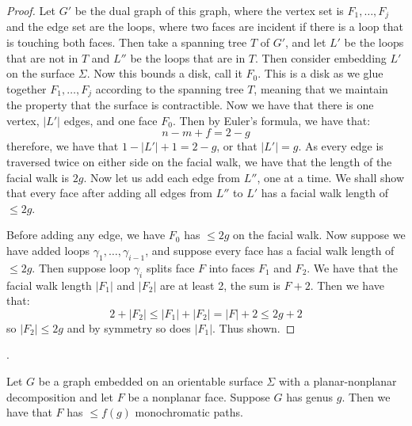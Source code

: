 \begin{proof}
	Let \(G'\) be the dual graph of this graph, where the vertex set is \(F_1, \ldots, F_j\) and the edge set are the loops, where two faces are incident if there is a loop that is touching both faces. Then take a spanning tree \(T\) of \(G'\), and let \(L'\) be the loops that are not in \(T\) and \(L''\) be the loops that are in \(T\). 
	Then consider embedding \(L'\) on the surface \(\Sigma\). Now this bounds a disk, call it \(F_0\). This is a disk as we glue together \(F_1, \ldots, F_j\) according to the spanning tree \(T\), meaning that we maintain the property that the surface is contractible.
	Now we have that there is one vertex, \(|L'|\) edges, and one face \(F_0\). Then by Euler's formula, we have that:
	\begin{equation}
		n - m + f = 2 - g
	\end{equation}
	therefore, we have that \(1 - |L'| + 1 = 2 - g\), or that \(|L'| = g\). As every edge is traversed twice on either side on the facial walk, we have that the length of the facial walk is \(2g\). 
	Now let us add each edge from \(L''\), one at a time. We shall show that every face after adding all edges from \(L''\) to \(L'\) has a facial walk length of \(\leq 2g\). 
	
	Before adding any edge, we have \(F_0\) has \(\leq 2g\) on the facial walk. Now suppose we have added loops \(\gamma_1, \ldots, \gamma_{i - 1}\), and suppose every face has a facial walk length of \(\leq 2g\). 
	Then suppose loop \(\gamma_i\) splits face \(F\) into faces \(F_1\) and \(F_2\). We have that the facial walk length \(|F_1|\) and \(|F_2|\) are at least 2, the sum is \(F + 2\). Then we have that: 
	\begin{equation}
		2 + |F_2| \leq |F_1| + |F_2| = |F| + 2 \leq 2g + 2
	\end{equation}
	so \(|F_2| \leq 2g\) and by symmetry so does \(|F_1|\). Thus shown.
\end{proof}
. 

\begin{corollary}\label{corr:orientable_nonplanar_faces}
	Let \(G\) be a graph embedded on an orientable surface \(\Sigma\) with a planar-nonplanar decomposition and let \(F\) be a nonplanar face. Suppose \(G\) has genus \(g\). Then we have that \(F\) has \(\leq f(g)\) monochromatic paths.
\end{corollary}

